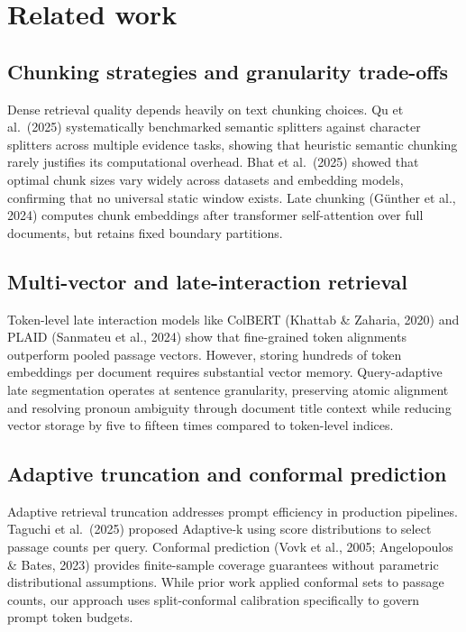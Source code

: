 \documentclass[preprint,12pt]{article}
\begin{document}
\section{Related work}

\subsection{Chunking strategies and granularity trade-offs}
Dense retrieval quality depends heavily on text chunking choices. Qu et al.~(2025) systematically benchmarked semantic splitters against character splitters across multiple evidence tasks, showing that heuristic semantic chunking rarely justifies its computational overhead. Bhat et al.~(2025) showed that optimal chunk sizes vary widely across datasets and embedding models, confirming that no universal static window exists. Late chunking (G\"unther et al., 2024) computes chunk embeddings after transformer self-attention over full documents, but retains fixed boundary partitions.

\subsection{Multi-vector and late-interaction retrieval}
Token-level late interaction models like ColBERT (Khattab \& Zaharia, 2020) and PLAID (Sanmateu et al., 2024) show that fine-grained token alignments outperform pooled passage vectors. However, storing hundreds of token embeddings per document requires substantial vector memory. Query-adaptive late segmentation operates at sentence granularity, preserving atomic alignment and resolving pronoun ambiguity through document title context while reducing vector storage by five to fifteen times compared to token-level indices.

\subsection{Adaptive truncation and conformal prediction}
Adaptive retrieval truncation addresses prompt efficiency in production pipelines. Taguchi et al.~(2025) proposed Adaptive-k using score distributions to select passage counts per query. Conformal prediction (Vovk et al., 2005; Angelopoulos \& Bates, 2023) provides finite-sample coverage guarantees without parametric distributional assumptions. While prior work applied conformal sets to passage counts, our approach uses split-conformal calibration specifically to govern prompt token budgets.
\end{document}
